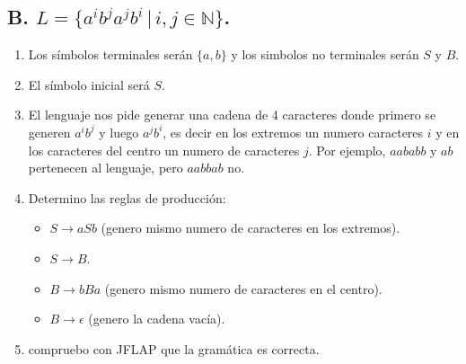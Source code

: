\documentclass{article}
\begin{document}
\begin{flushleft}
\begin{enumerate}
                

                 

            \end{enumerate}
        \end{flushleft}


        \newpage %
        \subsection*{B. $L = \{a^i b^j a^j b^i \, | \, i, j \in \mathbb{N}\}$.}
        \begin{flushleft}
            \begin{enumerate}

                \item Los símbolos terminales serán $\{a,b\}$ y los simbolos no terminales serán $S$ y $B$.

                \item El símbolo inicial será $S$.
            
                \item El lenguaje nos pide generar una cadena de 4 caracteres donde primero se generen $a^i b^j$ y luego $a^j b^i$, es decir en los extremos un numero caracteres $i$ y en los caracteres del centro un numero de caracteres $j$. 
                Por ejemplo, $aababb$ y $ab$ pertenecen al lenguaje, pero $aabbab$ no.

                \item Determino las reglas de producción:
                \begin{itemize}
                    \item $S \rightarrow aSb$ (genero mismo numero de caracteres en los extremos).
                    \item $S \rightarrow B$.
                    \item $B \rightarrow bBa$ (genero mismo numero de caracteres en el centro).
                    \item $B \rightarrow \epsilon$ (genero la cadena vacía).
                \end{itemize}

                \item compruebo con JFLAP que la gramática es correcta.


\end{enumerate}
\end{flushleft}
\end{document}
